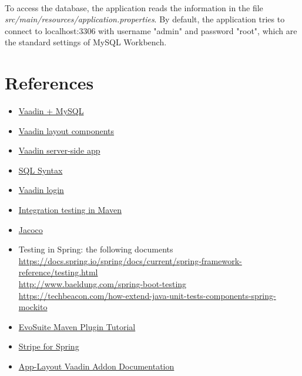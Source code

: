 \documentclass{article}
\begin{document}
		\paragraph{}To access the database, the application reads the information in the file \textit{src/main/resources/application.properties}. By default, the application tries to connect to localhost:3306 with username "admin" and password "root", which are the standard settings of MySQL Workbench.


\newpage
	\section{References}
\begin{itemize}
\item{}\href{https://vaadin.com/blog/building-a-web-ui-for-mysql-databases-in-plain-java-?utm_campaign=New%20registration&utm_source=hs_automation&utm_medium=email&utm_content=39610603&_hsenc=p2ANqtz--ut22Rfm32KlobpIHtq6LpH3COcrPL4sZEWDAXO1ZoRH34i0P46KUYGkVxwFIw49_cBYJPSgFVZ82j3sQ5lAAvDc8h-g&_hsmi=39610603}{Vaadin + MySQL}
\item{}\href{https://vaadin.com/docs/v8/framework/layout/layout-overview.html}{Vaadin layout components}
\item{}\href{https://vaadin.com/docs/v8/framework/application/application-overview.html}{Vaadin server-side app}
\item{}\href{https://www.w3schools.com/sql/default.asp}{SQL Syntax}
\item{}\href{https://examples.javacodegeeks.com/enterprise-java/vaadin/vaadin-login-example/}{Vaadin login}
\item{}\href{https://www.petrikainulainen.net/programming/maven/integration-testing-with-maven/}{Integration testing in Maven}
\item{}\href{https://www.petrikainulainen.net/programming/maven/creating-code-coverage-reports-for-unit-and-integration-tests-with-the-jacoco-maven-plugin/}{Jacoco}
\item{}Testing in Spring: the following documents
\\ 	\href{https://docs.spring.io/spring/docs/current/spring-framework-reference/testing.html}{https://docs.spring.io/spring/docs/current/spring-framework-reference/testing.html}
\\ 	\href{http://www.baeldung.com/spring-boot-testing}{http://www.baeldung.com/spring-boot-testing}
\\ 	\href{https://techbeacon.com/how-extend-java-unit-tests-components-spring-mockito}{https://techbeacon.com/how-extend-java-unit-tests-components-spring-mockito}
\item{}\href{http://www.evosuite.org/documentation/maven-plugin/}{EvoSuite Maven Plugin Tutorial}
\item{}\href{http://www.baeldung.com/java-stripe-api}{Stripe for Spring}
\item{}\href{https://vaadin.com/directory/component/app-layout-add-on}{App-Layout Vaadin Addon Documentation}
\end{itemize}			
\newpage
\end{document}
